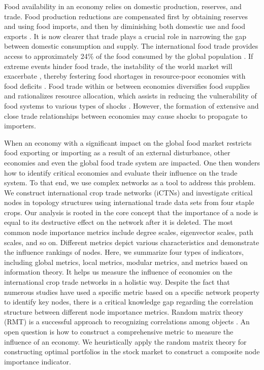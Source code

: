 \documentclass[preprint,3p,times,sort&compress]{elsarticle}
\begin{document}
Food availability in an economy relies on domestic production, reserves, and trade. Food production reductions are compensated first by obtaining reserves and using food imports, and then by diminishing both domestic use and food exports \cite{Jagermeyr-Robock-Elliott-Muller-Xia-Khabarov-Folberth-Schmid-Liu-Zabel-Rabin-Puma-Heslin-Franke-Foster-Asseng-Bardeen-Toon-Rosenzweig-2020-ProcNatlAcadSciUSA}. It is now clearer that trade plays a crucial role in narrowing the gap between domestic consumption and supply. The international food trade provides access to approximately 24\% of the food consumed by the global population \cite{DOdorico-Carr-Laio-Ridolfi-Vandoni-2014-EarthFuture}. If extreme events hinder food trade, the instability of the world market will exacerbate \cite{Anderson-Nelgen-2012-OxfRevEconPolicy}, thereby festering food shortages in resource-poor economies with food deficits \cite{Jagermeyr-Robock-Elliott-Muller-Xia-Khabarov-Folberth-Schmid-Liu-Zabel-Rabin-Puma-Heslin-Franke-Foster-Asseng-Bardeen-Toon-Rosenzweig-2020-ProcNatlAcadSciUSA}. Food trade within or between economies diversifies food supplies and rationalizes resource allocation, which assists in reducing the vulnerability of food systems to various types of shocks \cite{Laborde-Martin-Swinnen-Vos-2020-Science}. However, the formation of extensive and close trade relationships between economies may cause shocks to propagate to importers.

When an economy with a significant impact on the global food market restricts food exporting or importing as a result of an external disturbance, other economies and even the global food trade system are impacted. One then wonders how to identify critical economies and evaluate their influence on the trade system. To that end, we use complex networks as a tool to address this problem. We construct international crop trade networks (iCTNs) and investigate critical nodes in topology structures using international trade data sets from four staple crops. Our analysis is rooted in the core concept that the importance of a node is equal to its destructive effect on the network after it is deleted. The most common node importance metrics include degree scales, eigenvector scales, path scales, and so on. Different metrics depict various characteristics and demonstrate the influence rankings of nodes. Here, we summarize four types of indicators, including global metrics, local metrics, modular metrics, and metrics based on information theory. It helps us measure the influence of economies on the international crop trade networks in a holistic way. Despite the fact that numerous studies have used a specific metric based on a specific network property to identify key nodes, there is a critical knowledge gap regarding the correlation structure between different node importance metrics. Random matrix theory (RMT) is a successful approach to recognizing correlations among objects \cite{Garas-Argyrakis-2007-PhysicaA}. An open question is how to construct a comprehensive metric to measure the influence of an economy. We heuristically apply the random matrix theory for constructing optimal portfolios in the stock market to construct a composite node importance indicator. 
\end{document}
